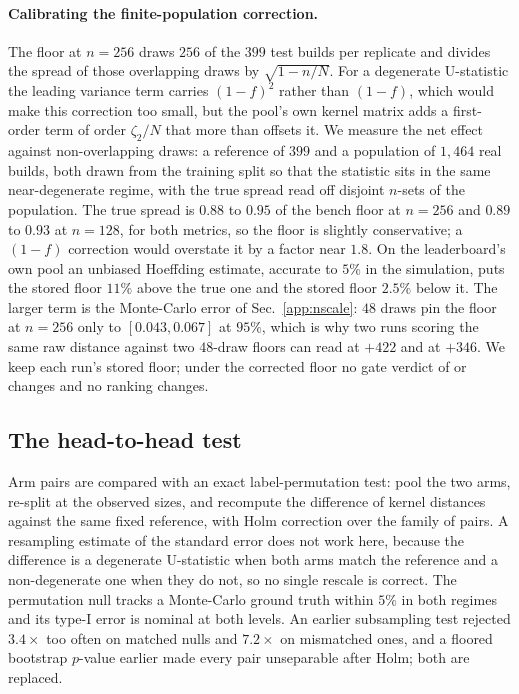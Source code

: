 \paragraph{Calibrating the finite-population correction.} The floor at $n{=}256$ draws
$256$ of the $399$ test builds per replicate and divides the spread of those overlapping
draws by $\sqrt{1-n/N}$. For a degenerate U-statistic the leading variance term carries
$(1-f)^2$ rather than $(1-f)$, which would make this correction too small, but the pool's own
kernel matrix adds a first-order term of order $\zeta_2/N$ that more than offsets it. We
measure the net effect against non-overlapping draws: a reference of $399$ and a population
of $1{,}464$ real builds, both drawn from the training split so that the statistic sits in the
same near-degenerate regime, with the true spread read off disjoint $n$-sets of the
population. The true spread is $0.88$ to $0.95$ of the bench floor at $n{=}256$ and $0.89$ to
$0.93$ at $n{=}128$, for both metrics, so the floor is slightly conservative; a $(1-f)$
correction would overstate it by a factor near $1.8$. On the leaderboard's own pool an
unbiased Hoeffding estimate, accurate to $5\%$ in the simulation, puts the stored \vkid{}
floor $11\%$ above the true one and the stored \mvkid{} floor $2.5\%$ below it. The larger
term is the Monte-Carlo error of Sec.~\ref{app:nscale}: $48$ draws pin the \vkid{} floor at
$n{=}256$ only to $[0.043, 0.067]$ at $95\%$, which is why two runs scoring the same raw
distance against two $48$-draw floors can read \matshuffle{} at $+422$ and at $+346$. We keep
each run's stored floor; under the corrected floor no gate verdict of \vkid{} or \mvkid{}
changes and no ranking changes.

\subsection{The head-to-head test}
\label{app:significance}

Arm pairs are compared with an exact label-permutation test: pool the two arms,
re-split at the observed sizes, and recompute the difference of kernel distances
against the same fixed reference, with Holm correction \citep{holm1979simple}
over the family of pairs. A resampling estimate of the standard error does not
work here, because the difference is a degenerate U-statistic when both arms
match the reference and a non-degenerate one when they do not, so no single
rescale is correct. The permutation null tracks a Monte-Carlo ground truth within
$5\%$ in both regimes and its type-I error is nominal at both levels. An earlier
subsampling test rejected $3.4\times$ too often on matched nulls and $7.2\times$
on mismatched ones, and a floored bootstrap $p$-value earlier made every pair
unseparable after Holm; both are replaced.

